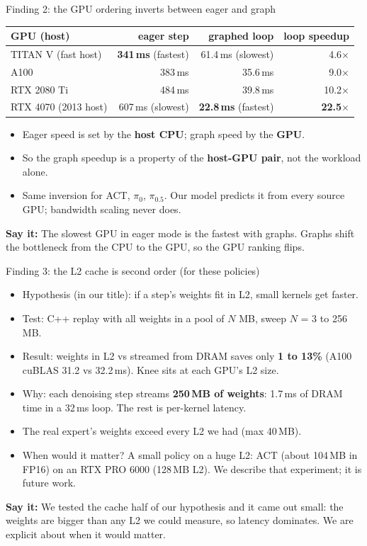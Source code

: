 \documentclass[aspectratio=169,10pt]{beamer}
\newcommand{\say}[1]{\par\vfill\noindent\colorbox{soft}{\parbox{\dimexpr\textwidth-2\fboxsep\relax}{\small\textbf{\textcolor{accent}{Say it:}} #1}}}
\begin{document}
\begin{frame}{Finding 2: the GPU ordering inverts between eager and graph}
\centering
\begin{tabular}{lrrr}\toprule
GPU (host) & eager step & graphed loop & loop speedup\\\midrule
TITAN V (fast host) & \textbf{341\,ms} (fastest) & 61.4\,ms (slowest) & 4.6$\times$\\
A100 & 383\,ms & 35.6\,ms & 9.0$\times$\\
RTX 2080 Ti & 484\,ms & 39.8\,ms & 10.2$\times$\\
RTX 4070 (2013 host) & 607\,ms (slowest) & \textbf{22.8\,ms} (fastest) & \textbf{22.5$\times$}\\\bottomrule
\end{tabular}
\vspace{0.8em}
\begin{itemize}
\item Eager speed is set by the \textbf{host CPU}; graph speed by the \textbf{GPU}.
\item So the graph speedup is a property of the \textbf{host-GPU pair}, not the workload alone.
\item Same inversion for ACT, $\pi_0$, $\pi_{0.5}$. Our model predicts it from every source GPU;
  bandwidth scaling never does.
\end{itemize}
\say{The slowest GPU in eager mode is the fastest with graphs. Graphs shift the bottleneck from
the CPU to the GPU, so the GPU ranking flips.}
\end{frame}

\begin{frame}{Finding 3: the L2 cache is second order (for these policies)}
\begin{itemize}
\item Hypothesis (in our title): if a step's weights fit in L2, small kernels get faster.
\item Test: C++ replay with all weights in a pool of $N$ MB, sweep $N$ = 3 to 256\,MB.
\item Result: weights in L2 vs streamed from DRAM saves only \textbf{1 to 13\%}
  (A100 cuBLAS 31.2 vs 32.2\,ms). Knee sits at each GPU's L2 size.
\item Why: each denoising step streams \textbf{250\,MB of weights}: 1.7\,ms of DRAM time in a
  32\,ms loop. The rest is per-kernel latency.
\item The real expert's weights exceed every L2 we had (max 40\,MB).
\item When would it matter? A small policy on a huge L2: ACT (about 104\,MB in FP16) on an RTX
  PRO 6000 (128\,MB L2). We describe that experiment; it is future work.
\end{itemize}
\say{We tested the cache half of our hypothesis and it came out small: the weights are bigger
than any L2 we could measure, so latency dominates. We are explicit about when it would matter.}
\end{frame}
\end{document}
